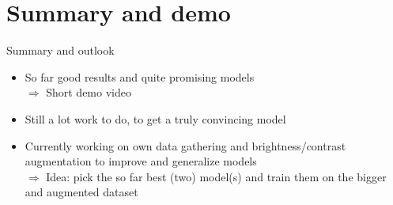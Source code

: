 \section{Summary and demo}
\begin{frame}{Summary and outlook}
\begin{itemize}
\item So far good results and quite promising models\\
$\Rightarrow$ Short demo video
\item Still a lot work to do, to get a truly convincing model
\item Currently working on own data gathering and brightness/contrast augmentation to improve and 
generalize models\\
$\Rightarrow$ Idea: pick the so far best (two) model(s) and train them on the bigger and augmented dataset
\end{itemize}
\end{frame}
